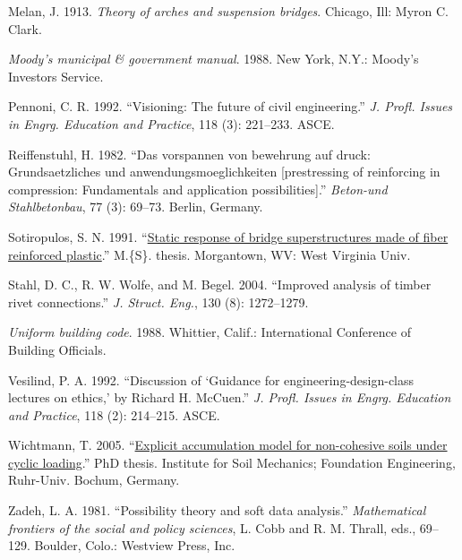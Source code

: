 \documentclass[
  NewProceedings,
  letterpaper]{./assets/ascelike-new}
\newlength{\cslhangindent}
\newlength{\cslentryspacingunit} %
\newenvironment{CSLReferences}[2] %
 {%
  \setlength{\parindent}{0pt}
  \ifodd #1
  \let\oldpar\par
  \def\par{\hangindent=\cslhangindent\oldpar}
  \fi
  \setlength{\parskip}{#2\cslentryspacingunit}
 }%
 {}
\begin{document}
\begin{CSLReferences}{1}{0}
\leavevmode{}%
Melan, J. 1913. \emph{Theory of arches and suspension bridges}. Chicago,
Ill: Myron C. Clark.

\leavevmode{}%
\emph{Moody's municipal \& government manual}. 1988. New York, N.Y.:
Moody's Investors Service.

\leavevmode{}%
Pennoni, C. R. 1992. {``Visioning: The future of civil engineering.''}
\emph{J. Profl. Issues in Engrg. Education and Practice}, 118 (3):
221--233. ASCE.

\leavevmode{}%
Reiffenstuhl, H. 1982. {``Das vorspannen von bewehrung auf druck:
Grundsaetzliches und anwendungsmoeglichkeiten {[}prestressing of
reinforcing in compression: Fundamentals and application
possibilities{]}.''} \emph{Beton-und Stahlbetonbau}, 77 (3): 69--73.
Berlin, Germany.

\leavevmode{}%
Sotiropulos, S. N. 1991. {``\href{}{Static response of bridge
superstructures made of fiber reinforced plastic}.''} M.\{S\}. thesis.
Morgantown, WV: West Virginia Univ.

\leavevmode{}%
Stahl, D. C., R. W. Wolfe, and M. Begel. 2004. {``Improved analysis of
timber rivet connections.''} \emph{J. Struct. Eng.}, 130 (8):
1272--1279.

\leavevmode{}%
\emph{Uniform building code}. 1988. Whittier, Calif.: International
Conference of Building Officials.

\leavevmode{}%
Vesilind, P. A. 1992. {``Discussion of {`{G}uidance for
engineering-design-class lectures on ethics,'} by {R}ichard {H}.
{M}c{C}uen.''} \emph{J. Profl. Issues in Engrg. Education and Practice},
118 (2): 214--215. ASCE.

\leavevmode{}%
Wichtmann, T. 2005.
{``\href{https://www.rz.uni-karlsruhe.de/$/sim$gn97/}{Explicit
accumulation model for non-cohesive soils under cyclic loading}.''} PhD
thesis. Institute for Soil Mechanics; Foundation Engineering, Ruhr-Univ.
Bochum, Germany.

\leavevmode{}%
Zadeh, L. A. 1981. {``Possibility theory and soft data analysis.''}
\emph{Mathematical frontiers of the social and policy sciences}, L. Cobb
and R. M. Thrall, eds., 69--129. Boulder, Colo.: Westview Press, Inc.

\end{CSLReferences}
\end{document}
